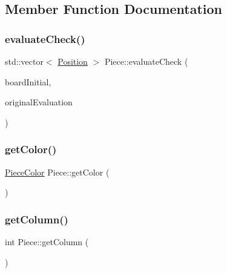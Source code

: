 \subsection{Member Function Documentation}
\mbox{\label{class_piece_a0769c700d680b8036002c0427b7ac559}} 
\subsubsection{\texorpdfstring{evaluate\+Check()}{evaluateCheck()}}
{\footnotesize\ttfamily std\+::vector$<$ \hyperlink{struct_position}{Position} $>$ Piece\+::evaluate\+Check (\begin{DoxyParamCaption}\item[{std\+::shared\+\_\+ptr$<$ \hyperlink{class_base_board}{Base\+Board} $>$}]{board\+Initial,  }\item[{bool}]{original\+Evaluation }\end{DoxyParamCaption})}

\mbox{\label{class_piece_a184ce3e31f7b4d8a3d616a60fe60522e}} 
\subsubsection{\texorpdfstring{get\+Color()}{getColor()}}
{\footnotesize\ttfamily \hyperlink{_piece_8h_ad7595c48bb74c0dd2a7648712a2d4985}{Piece\+Color} Piece\+::get\+Color (\begin{DoxyParamCaption}{ }\end{DoxyParamCaption})}

\mbox{\label{class_piece_a3396fcbbe54260076bf2f6a39b0fb920}} 
\subsubsection{\texorpdfstring{get\+Column()}{getColumn()}}
{\footnotesize\ttfamily int Piece\+::get\+Column (\begin{DoxyParamCaption}{ }\end{DoxyParamCaption})}

\mbox{\label{class_piece_a094d0d28514219ab3f155d9241bb8f22}} 
